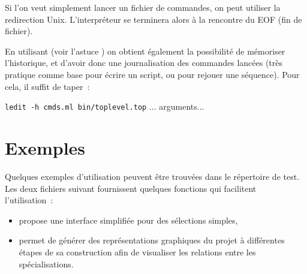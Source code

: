 Si l'on veut simplement lancer un fichier de commandes,
on peut utiliser la redirection Unix.
L'interpréteur se terminera alors à la rencontre du EOF (fin de fichier).

\begin{astuce}\label{astuce-jnl-ledit}
En utilisant  (voir l'astuce )
on obtient également la possibilité de mémoriser
l'historique, et d'avoir donc une journalisation des commandes lancées (très
pratique comme base pour écrire un script, ou pour rejouer une séquence).
Pour cela, il suffit de taper~:

\centerline{{\tt ledit -h cmds.ml bin/toplevel.top} ... arguments...}
\end{astuce}

\section{Exemples}

Quelques exemples d'utilisation peuvent être trouvées dans le répertoire de
test. Les deux fichiers suivant fournissent quelques fonctions qui facilitent
l'utilisation~:
\begin{itemize}
  \item {} propose une interface simplifiée pour des sélections
    simples,
  \item {} permet de générer des représentations graphiques du
    projet à différentes étapes de sa construction afin de visualiser
    les relations entre les spécialisations.
\end{itemize}
